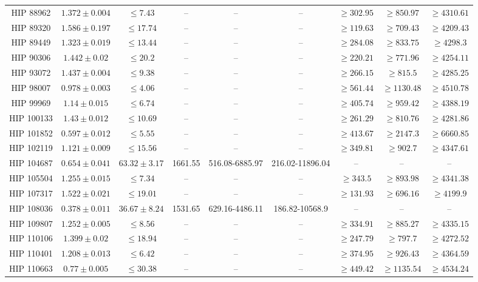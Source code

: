 {\begin{longtable}{|c|c|c|c|c|c|c|c|c|}
HIP 88962 & $ 1.372 \pm 0.004 $ & $\le 7.43 $ &-- &-- &-- & $\ge 302.95 $ & $\ge 850.97 $ & $\ge 4310.61 $ \\
HIP 89320 & $ 1.586 \pm 0.197 $ & $\le 17.74 $ &-- &-- &-- & $\ge 119.63 $ & $\ge 709.43 $ & $\ge 4209.43 $ \\
HIP 89449 & $ 1.323 \pm 0.019 $ & $\le 13.44 $ &-- &-- &-- & $\ge 284.08 $ & $\ge 833.75 $ & $\ge 4298.3 $ \\
HIP 90306 & $ 1.442 \pm 0.02 $ & $\le 20.2 $ &-- &-- &-- & $\ge 220.21 $ & $\ge 771.96 $ & $\ge 4254.11 $ \\
HIP 93072 & $ 1.437 \pm 0.004 $ & $\le 9.38 $ &-- &-- &-- & $\ge 266.15 $ & $\ge 815.5 $ & $\ge 4285.25 $ \\
HIP 98007 & $ 0.978 \pm 0.003 $ & $\le 4.06 $ &-- &-- &-- & $\ge 561.44 $ & $\ge 1130.48 $ & $\ge 4510.78 $ \\
HIP 99969 & $ 1.14 \pm 0.015 $ & $\le 6.74 $ &-- &-- &-- & $\ge 405.74 $ & $\ge 959.42 $ & $\ge 4388.19 $ \\
HIP 100133 & $ 1.43 \pm 0.012 $ & $\le 10.69 $ &-- &-- &-- & $\ge 261.29 $ & $\ge 810.76 $ & $\ge 4281.86 $ \\
HIP 101852 & $ 0.597 \pm 0.012 $ & $\le 5.55 $ &-- &-- &-- & $\ge 413.67 $ & $\ge 2147.3 $ & $\ge 6660.85 $ \\
HIP 102119 & $ 1.121 \pm 0.009 $ & $\le 15.56 $ &-- &-- &-- & $\ge 349.81 $ & $\ge 902.7 $ & $\ge 4347.61 $ \\
HIP 104687 & $ 0.654 \pm 0.041 $ & $ 63.32 \pm 3.17 $ & 1661.55 & 516.08-6885.97 & 216.02-11896.04 &-- &-- &-- \\
HIP 105504 & $ 1.255 \pm 0.015 $ & $\le 7.34 $ &-- &-- &-- & $\ge 343.5 $ & $\ge 893.98 $ & $\ge 4341.38 $ \\
HIP 107317 & $ 1.522 \pm 0.021 $ & $\le 19.01 $ &-- &-- &-- & $\ge 131.93 $ & $\ge 696.16 $ & $\ge 4199.9 $ \\
HIP 108036 & $ 0.378 \pm 0.011 $ & $ 36.67 \pm 8.24 $ & 1531.65 & 629.16-4486.11 & 186.82-10568.9 &-- &-- &-- \\
HIP 109807 & $ 1.252 \pm 0.005 $ & $\le 8.56 $ &-- &-- &-- & $\ge 334.91 $ & $\ge 885.27 $ & $\ge 4335.15 $ \\
HIP 110106 & $ 1.399 \pm 0.02 $ & $\le 18.94 $ &-- &-- &-- & $\ge 247.79 $ & $\ge 797.7 $ & $\ge 4272.52 $ \\
HIP 110401 & $ 1.208 \pm 0.013 $ & $\le 6.42 $ &-- &-- &-- & $\ge 374.95 $ & $\ge 926.43 $ & $\ge 4364.59 $ \\
HIP 110663 & $ 0.77 \pm 0.005 $ & $\le 30.38 $ &-- &-- &-- & $\ge 449.42 $ & $\ge 1135.54 $ & $\ge 4534.24 $ \\

\end{longtable}}

